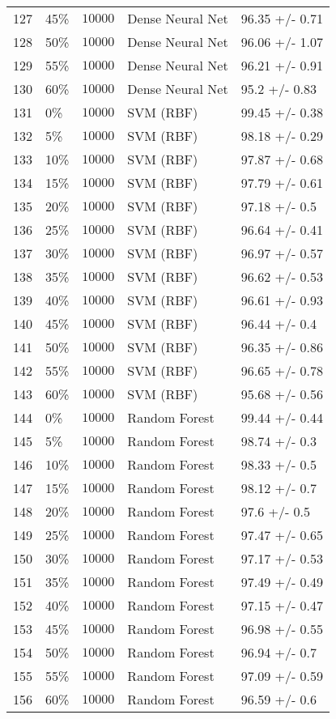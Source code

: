 \begin{table}[!tbp]
\begin{center}
\begin{tabular}{llrll}
127&45\%&$10000$&Dense Neural Net&96.35 +/- 0.71\tabularnewline
128&50\%&$10000$&Dense Neural Net&96.06 +/- 1.07\tabularnewline
129&55\%&$10000$&Dense Neural Net&96.21 +/- 0.91\tabularnewline
130&60\%&$10000$&Dense Neural Net&95.2 +/- 0.83\tabularnewline
131&0\%&$10000$&SVM (RBF)&99.45 +/- 0.38\tabularnewline
132&5\%&$10000$&SVM (RBF)&98.18 +/- 0.29\tabularnewline
133&10\%&$10000$&SVM (RBF)&97.87 +/- 0.68\tabularnewline
134&15\%&$10000$&SVM (RBF)&97.79 +/- 0.61\tabularnewline
135&20\%&$10000$&SVM (RBF)&97.18 +/- 0.5\tabularnewline
136&25\%&$10000$&SVM (RBF)&96.64 +/- 0.41\tabularnewline
137&30\%&$10000$&SVM (RBF)&96.97 +/- 0.57\tabularnewline
138&35\%&$10000$&SVM (RBF)&96.62 +/- 0.53\tabularnewline
139&40\%&$10000$&SVM (RBF)&96.61 +/- 0.93\tabularnewline
140&45\%&$10000$&SVM (RBF)&96.44 +/- 0.4\tabularnewline
141&50\%&$10000$&SVM (RBF)&96.35 +/- 0.86\tabularnewline
142&55\%&$10000$&SVM (RBF)&96.65 +/- 0.78\tabularnewline
143&60\%&$10000$&SVM (RBF)&95.68 +/- 0.56\tabularnewline
144&0\%&$10000$&Random Forest&99.44 +/- 0.44\tabularnewline
145&5\%&$10000$&Random Forest&98.74 +/- 0.3\tabularnewline
146&10\%&$10000$&Random Forest&98.33 +/- 0.5\tabularnewline
147&15\%&$10000$&Random Forest&98.12 +/- 0.7\tabularnewline
148&20\%&$10000$&Random Forest&97.6 +/- 0.5\tabularnewline
149&25\%&$10000$&Random Forest&97.47 +/- 0.65\tabularnewline
150&30\%&$10000$&Random Forest&97.17 +/- 0.53\tabularnewline
151&35\%&$10000$&Random Forest&97.49 +/- 0.49\tabularnewline
152&40\%&$10000$&Random Forest&97.15 +/- 0.47\tabularnewline
153&45\%&$10000$&Random Forest&96.98 +/- 0.55\tabularnewline
154&50\%&$10000$&Random Forest&96.94 +/- 0.7\tabularnewline
155&55\%&$10000$&Random Forest&97.09 +/- 0.59\tabularnewline
156&60\%&$10000$&Random Forest&96.59 +/- 0.6\tabularnewline
\hline
\end{tabular}\end{center}
\end{table}
